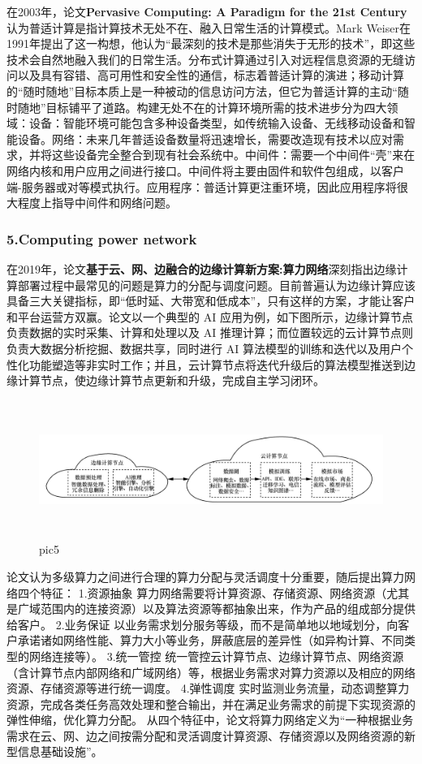 \documentclass[a4paper,twoside]{scrbook}
\begin{document}
在2003年，论文\textbf{Pervasive Computing: A Paradigm for the 21st Century}认为普适计算是指计算技术无处不在、融入日常生活的计算模式。Mark Weiser在1991年提出了这一构想，他认为“最深刻的技术是那些消失于无形的技术”，即这些技术会自然地融入我们的日常生活。分布式计算通过引入对远程信息资源的无缝访问以及具有容错、高可用性和安全性的通信，标志着普适计算的演进；移动计算的“随时随地”目标本质上是一种被动的信息访问方法，但它为普适计算的主动“随时随地”目标铺平了道路。构建无处不在的计算环境所需的技术进步分为四大领域：设备：智能环境可能包含多种设备类型，如传统输入设备、无线移动设备和智能设备。网络：未来几年普适设备数量将迅速增长，需要改造现有技术以应对需求，并将这些设备完全整合到现有社会系统中。中间件：需要一个中间件“壳”来在网络内核和用户应用之间进行接口。中间件将主要由固件和软件包组成，以客户端-服务器或对等模式执行。应用程序：普适计算更注重环境，因此应用程序将很大程度上指导中间件和网络问题。


\subsubsection{5.Computing power network}
在2019年，论文\textbf{基于云、网、边融合的边缘计算新方案:算力网络}深刻指出边缘计算部署过程中最常见的问题是算力的分配与调度问题。目前普遍认为边缘计算应该具备三大关键指标，即“低时延、大带宽和低成本”，只有这样的方案，才能让客户和平台运营方双赢。论文以一个典型的 AI 应用为例，如下图所示，边缘计算节点负责数据的实时采集、计算和处理以及 AI 推理计算；而位置较远的云计算节点则负责大数据分析挖掘、数据共享，同时进行 AI 算法模型的训练和迭代以及用户个性化功能塑造等非实时工作；并且，云计算节点将迭代升级后的算法模型推送到边缘计算节点，使边缘计算节点更新和升级，完成自主学习闭环。
\begin{figure}
\centering %
\includegraphics[height=4.5cm,width=13.5cm]{AI c e.png}
\caption{pic5}
\end{figure}
论文认为多级算力之间进行合理的算力分配与灵活调度十分重要，随后提出算力网络四个特征：
1.资源抽象
算力网络需要将计算资源、存储资源、网络资源（尤其是广域范围内的连接资源）以及算法资源等都抽象出来，作为产品的组成部分提供给客户。
2.业务保证
以业务需求划分服务等级，而不是简单地以地域划分，向客户承诺诸如网络性能、算力大小等业务，屏蔽底层的差异性（如异构计算、不同类型的网络连接等）。
3.统一管控
统一管控云计算节点、边缘计算节点、网络资源（含计算节点内部网络和广域网络）等，根据业务需求对算力资源以及相应的网络资源、存储资源等进行统一调度。
4.弹性调度
实时监测业务流量，动态调整算力资源，完成各类任务高效处理和整合输出，并在满足业务需求的前提下实现资源的弹性伸缩，优化算力分配。
从四个特征中，论文将算力网络定义为“一种根据业务需求在云、网、边之间按需分配和灵活调度计算资源、存储资源以及网络资源的新型信息基础设施”。
\end{document}
